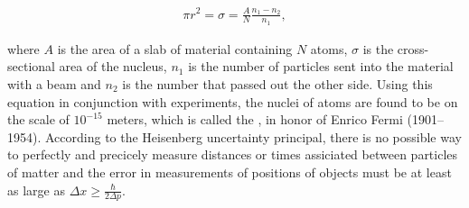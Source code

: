 \begin{align}
 \pi r^2 = \sigma = \frac{A}{N}\frac{n_1-n_2}{n_1},
\end{align}

where $A$ is the area of a slab of material containing $N$ atoms, $\sigma$ is the cross-sectional area of the nucleus, $n_1$ is the number of particles sent into the material with a beam and $n_2$ is the number that passed out the other side. Using this equation in conjunction with experiments, the nuclei of atoms are found to be on the scale of $10^{-15}$ meters, which is called the , in honor of Enrico Fermi (1901–1954). According to the Heisenberg uncertainty principal, there is no possible way to perfectly and precicely measure distances or times assiciated between particles of matter and the error in measurements of positions of objects must be at least as large as $\Delta x \geq \frac{\hbar}{2\Delta p}$.












